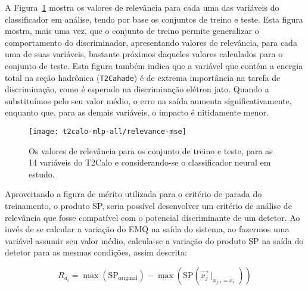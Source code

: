 A Figura~\ref{fig:t2calo-mlp-all-relevance} mostra os valores de relevância
para cada uma das variáveis do classificador em análise, tendo por base os
conjuntos de treino e teste. Esta figura mostra, mais uma vez, que o conjunto
de treino permite generalizar o comportamento do discriminador, apresentando
valores de relevância, para cada uma de suas variáveis, bastante próximos
daqueles valores calculados para o conjunto de teste. Esta figura também
indica que a variável que contém a energia total na seção hadrônica
(\texttt{T2Cahade}) é de extrema importância na tarefa de discriminação, como
é esperado na discriminação elétron jato. Quando a substituímos pelo seu valor
médio, o erro na saída aumenta significativamente, enquanto que, para as
demais variáveis, o impacto é nitidamente menor.

\begin{figure}
\begin{center}
\texttt{[image: t2calo-mlp-all/relevance-mse]}
\end{center}
\caption{Os valores de relevância para os conjunto de treino e
teste, para as 14 variáveis do T2Calo e considerando-se o classificador neural
em estudo.}
\label{fig:t2calo-mlp-all-relevance}
\end{figure}

Aproveitando a figura de mérito utilizada para o critério de parada do
treinamento, o produto SP, seria possível desenvolver um critério de análise
de relevância que fosse compatível com o potencial discriminante de um
detetor. Ao invés de se calcular a variação do EMQ na saída do sistema, ao
fazermos uma variável assumir seu valor médio, calcula-se a variação do
produto SP na saída do detetor para as mesmas condições, assim descrita:

\begin{equation}
R_{d_i} = \max(\text{SP}_{\text{original}}) - \max(\text{SP}(\overrightarrow{x_j}\mid_{x_{j,i} = \overline{x}_i}))
\label{eq:relevance-sp}
\end{equation}


